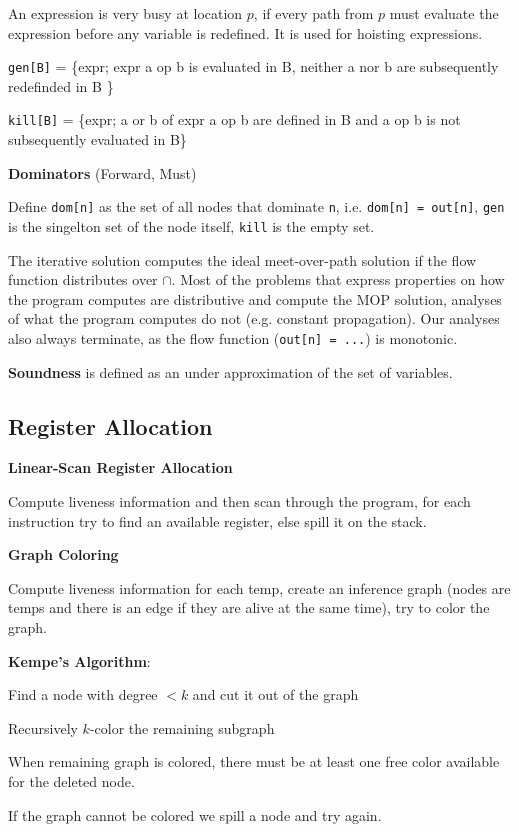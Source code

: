 An expression is very busy at location $p$, if every path from $p$ must evaluate the expression before any variable is redefined. It is used for hoisting expressions.\smallskip

\texttt{gen[B]} = \{expr; expr a op b is evaluated in B, neither a nor b are subsequently redefinded in B \}\smallskip

\texttt{kill[B]} = \{expr; a or b of expr a op b are defined in B and a op b is not subsequently evaluated in B\} \medskip

\textbf{Dominators} (Forward, Must)\medskip

Define \texttt{dom[n]} as the set of all nodes that dominate \texttt{n}, i.e. \texttt{dom[n] = out[n]}, \texttt{gen} is the singelton set of the node itself, \texttt{kill} is the empty set.\medskip

The iterative solution computes the ideal meet-over-path solution if the flow function distributes over $\cap$. Most of the problems that express properties on how the program computes are distributive and compute the MOP solution, analyses of what the program computes do not (e.g. constant propagation). Our analyses also always terminate, as the flow function (\texttt{out[n] = ...}) is monotonic.\medskip

\textbf{Soundness} is defined as an under approximation of the set of variables.


\subsection*{Register Allocation}

\textbf{Linear-Scan Register Allocation}\medskip

Compute liveness information and then scan through the program, for each instruction try to find an available register, else spill it on the stack.\medskip
	
\textbf{Graph Coloring}\medskip

Compute liveness information for each temp, create an inference graph (nodes are temps and there is an edge if they are alive at the same time), try to color the graph.\medskip
	
\textbf{Kempe's Algorithm}: 
\begin{compactitem}
	\item Find a node with degree $< k$ and cut it out of the graph
	\item Recursively $k$-color the remaining subgraph
	\item When remaining graph is colored, there must be at least one free color available for the deleted node.
	\item If the graph cannot be colored we spill a node and try again.
\end{compactitem}\medskip


